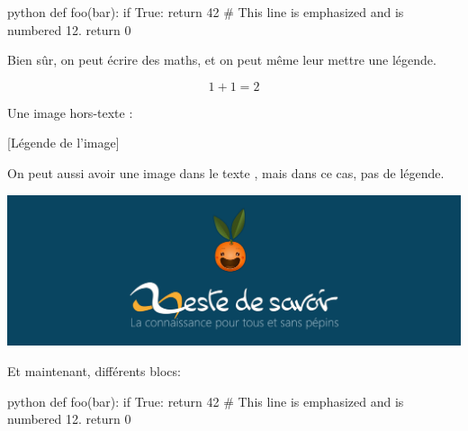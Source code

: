 \documentclass[small]{zmdocument}
\begin{document}
\begin{CodeBlock}[][12][10]{python}
def foo(bar):
    if True:
        return 42 # This line is emphasized and is numbered 12.
    return 0
\end{CodeBlock}

Bien sûr, on peut écrire des maths, et on peut même leur mettre une légende.

\[
   1 + 1 = 2
\]

Une image hors-texte :

[Légende de l’image]

On peut aussi avoir une image dans le texte , mais dans ce cas, pas de légende.

\begin{center}
\includegraphics[width=\linewidth]{./test-images/logo.png}
\end{center}


Et maintenant, différents blocs:

\begin{Information}
\blindtext
\begin{Question}
\blindtext
\end{Question}
\end{Information}

\begin{Question}
\blindtext
\begin{CodeBlock}[][12][10]{python}
def foo(bar):
    if True:
        return 42 # This line is emphasized and is numbered 12.
    return 0
\end{CodeBlock}
\blindtext
\end{Question}

\begin{Warning}
\blindtext
\end{Warning}

\begin{Error}
\blindtext
\end{Error}
\end{document}
